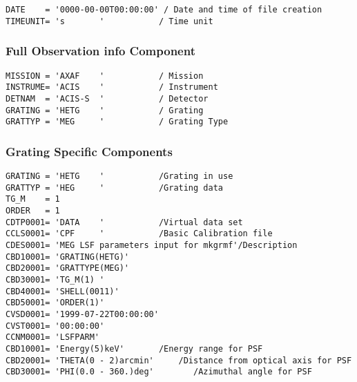 \documentclass[twoside]{article}
\begin{document}
\begin{verbatim}
DATE    = '0000-00-00T00:00:00' / Date and time of file creation
TIMEUNIT= 's       '           / Time unit
\end{verbatim}

\subsubsection{Full Observation info Component}

\begin{verbatim}
MISSION = 'AXAF    '           / Mission
INSTRUME= 'ACIS    '           / Instrument
DETNAM  = 'ACIS-S  '           / Detector
GRATING = 'HETG    '           / Grating
GRATTYP = 'MEG     '           / Grating Type  
\end{verbatim}



\subsubsection{Grating Specific Components}
\begin{verbatim}
GRATING = 'HETG    '           /Grating in use
GRATTYP = 'HEG     '           /Grating data
TG_M    = 1
ORDER   = 1
CDTP0001= 'DATA    '           /Virtual data set
CCLS0001= 'CPF     '           /Basic Calibration file
CDES0001= 'MEG LSF parameters input for mkgrmf'/Description
CBD10001= 'GRATING(HETG)'
CBD20001= 'GRATTYPE(MEG)'
CBD30001= 'TG_M(1) '
CBD40001= 'SHELL(0011)'
CBD50001= 'ORDER(1)'
CVSD0001= '1999-07-22T00:00:00'
CVST0001= '00:00:00'
CCNM0001= 'LSFPARM'
CBD10001= 'Energy(5)keV'       /Energy range for PSF
CBD20001= 'THETA(0 - 2)arcmin'     /Distance from optical axis for PSF
CBD30001= 'PHI(0.0 - 360.)deg'        /Azimuthal angle for PSF

\end{verbatim}

%

\clearpage
\end{document}
